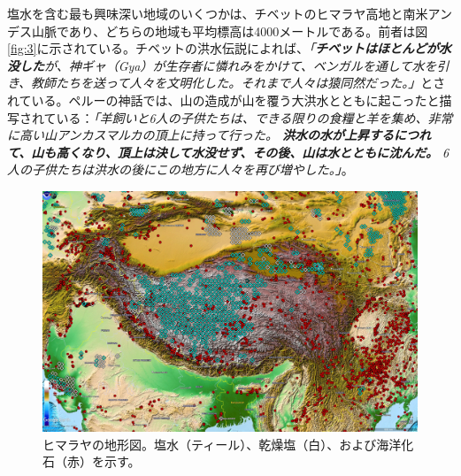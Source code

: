 \documentclass[10pt,twocolumn,letterpaper]{article}
\begin{document}


塩水を含む最も興味深い地域のいくつかは、チベットのヒマラヤ高地と南米アンデス山脈であり、どちらの地域も平均標高は4000メートルである。前者は図\ref{fig:3}に示されている。チベットの洪水伝説によれば、\textit{「\textbf{チベットはほとんどが水没した}が、神ギャ（Gya）が生存者に憐れみをかけて、ベンガルを通して水を引き、教師たちを送って人々を文明化した。それまで人々は猿同然だった。」}\cite{3}とされている。ペルーの神話では、山の造成が山を覆う大洪水とともに起こったと描写されている：\textit{「羊飼いと6人の子供たちは、できる限りの食糧と羊を集め、非常に高い山アンカスマルカの頂上に持って行った。 \textbf{洪水の水が上昇するにつれて、山も高くなり、頂上は決して水没せず、その後、山は水とともに沈んだ。} 6人の子供たちは洪水の後にこの地方に人々を再び増やした。」}\cite{3}。

\begin{figure}[t]
\begin{center}
   \includegraphics[width=1\linewidth]{tibet.jpg}
\end{center}
   \caption{ヒマラヤの地形図。塩水（ティール）、乾燥塩（白）、および海洋化石（赤）を示す\cite{15,16,86,87}。}
\label{fig:3}
\label{fig:onecol}
\end{figure}
\end{document}
